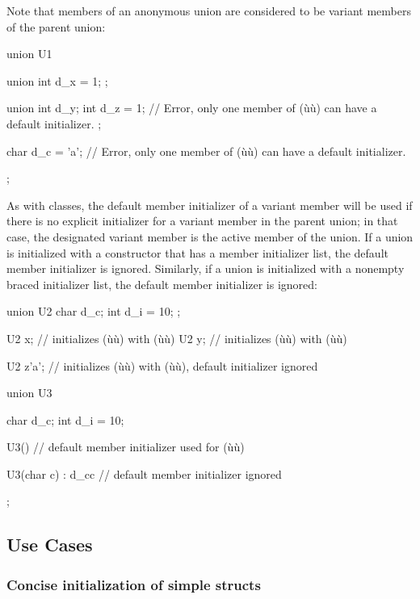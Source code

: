 Note that members of an anonymous union are considered to be variant
members of the parent union:

\begin{emcppslisting}
union U1
{
    union { int d_x = 1; };

    union
    {
        int d_y;
        int d_z = 1;
            // Error, only one member of (ù{}ù) can have a default initializer.
    };

    char d_c = 'a';
        // Error, only one member of (ù{}ù) can have a default initializer.
};
\end{emcppslisting}
    

As with classes, the default member initializer of a variant member will
be used if there is no explicit initializer for a variant member in the
parent union; in that case, the designated variant member is the active
member of the union. If a union is initialized with a constructor that
has a member initializer list, the default member initializer is
ignored. Similarly, if a union is initialized with a nonempty braced
initializer list, the default member initializer is ignored:

\begin{emcppslisting}
union U2
{
    char d_c;
    int  d_i = 10;
};

U2 x;       // initializes (ù{}ù) with (ù{}ù)
U2 y{};     // initializes (ù{}ù) with (ù{}ù)

U2 z{'a'};  // initializes (ù{}ù) with (ù{}ù), default initializer ignored

union U3
{
   char d_c;
   int  d_i = 10;

   U3() { }                 // default member initializer used for (ù{}ù)

   U3(char c) : d_c{c} { }  // default member initializer ignored
};
\end{emcppslisting}
    

\subsection[Use Cases]{Use Cases}\label{use-cases}

\subsubsection[Concise initialization of simple \lstinline!struct!s]{Concise initialization of simple {\SubsubsecCode struct}s}\label{concise-initialization-of-simple-structs}

